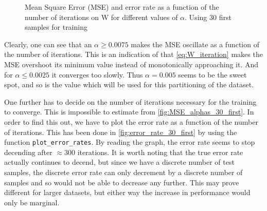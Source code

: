 \documentclass{article}
\begin{document}
\begin{figure}
    \centering
    \caption{Mean Square Error (MSE) and error rate as a function of the number of iterations on W
    for different values of $\alpha$. Using 30 first samples for training}
\end{figure}

Clearly, one can see that an $\alpha \geq 0.0075$ makes the MSE oscillate as a function of the number
of iterations. This is an indication of that \eqref{eq:W_iteration} makes the MSE overshoot its
minimum value instead of monotonically approaching it. And for $\alpha \leq 0.0025$ it converges
too slowly. Thus $\alpha = 0.005$ seems to be the sweet spot, and so is the value which will be used
for this partitioning of the dataset.

One further has to decide on the number of iterations necessary for the training to converge. This
is impossible to estimate from \autoref{fig:MSE_alphas_30_first}. In order to find this out,
we have to plot the error rate as a function of the number of iterations. This has been done in
\autoref{fig:error_rate_30_first} by using the function \lstinline{plot_error_rates}. By reading the graph,
the error rate seems to stop decending after $\approx 300$ iterations. It is worth noting that the true error rate
actually continues to decend, but since we have a discrete number of test samples, the discrete error rate
can only decrement by a discrete number of samples and so would not be able to decrease any further.
This may prove different for larger datasets, but either way the increase in performance would only be
marginal.
\end{document}
